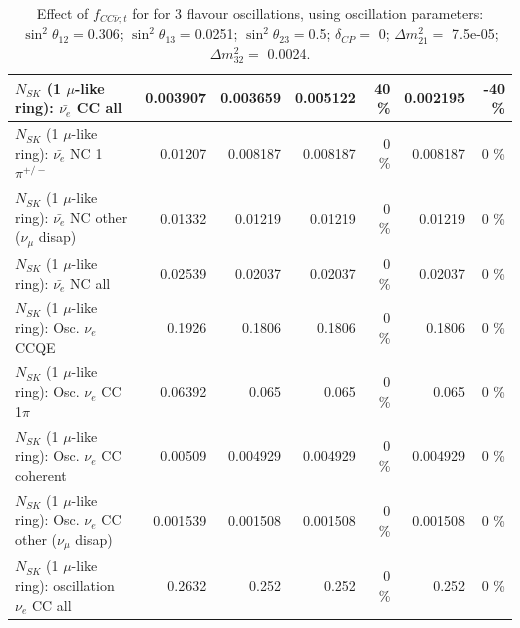 \begin{table}
\begin{tabular}{| l | r | r | r  r | r  r |}
                            $N_{SK}$ (1 $\mu$-like ring): $\bar{\nu_{e}}$ CC all &        0.003907 &        0.003659 &        0.005122 &       40 \%  &        0.002195 &      -40 \%  \\ 
\hline
                     $N_{SK}$ (1 $\mu$-like ring): $\bar{\nu_e}$ NC 1$\pi^{+/-}$ &         0.01207 &        0.008187 &        0.008187 &        0 \%  &        0.008187 &        0 \%  \\ 
          $N_{SK}$ (1 $\mu$-like ring): $\bar{\nu_e}$ NC other ($\nu_\mu$ disap) &         0.01332 &         0.01219 &         0.01219 &        0 \%  &         0.01219 &        0 \%  \\ 
                            $N_{SK}$ (1 $\mu$-like ring): $\bar{\nu_{e}}$ NC all &         0.02539 &         0.02037 &         0.02037 &        0 \%  &         0.02037 &        0 \%  \\ 
\hline
\hline
\hline
                                 $N_{SK}$ (1 $\mu$-like ring): Osc. $\nu_e$ CCQE &          0.1926 &          0.1806 &          0.1806 &        0 \%  &          0.1806 &        0 \%  \\ 
                            $N_{SK}$ (1 $\mu$-like ring): Osc. $\nu_e$ CC 1$\pi$ &         0.06392 &           0.065 &           0.065 &        0 \%  &           0.065 &        0 \%  \\ 
                          $N_{SK}$ (1 $\mu$-like ring): Osc. $\nu_e$ CC coherent &         0.00509 &        0.004929 &        0.004929 &        0 \%  &        0.004929 &        0 \%  \\ 
           $N_{SK}$ (1 $\mu$-like ring): Osc. $\nu_e$ CC other ($\nu_\mu$ disap) &        0.001539 &        0.001508 &        0.001508 &        0 \%  &        0.001508 &        0 \%  \\ 
                        $N_{SK}$ (1 $\mu$-like ring): oscillation $\nu_e$ CC all &          0.2632 &           0.252 &           0.252 &        0 \%  &           0.252 &        0 \%  \\ 
\hline
\hline
\end{tabular}
\caption{ Effect of $f_{CC\bar{\nu}; t}$ for for 3 flavour oscillations, using oscillation parameters:  $\sin^2\theta_{12} = $0.306; $\sin^2\theta_{13} = $0.0251; $\sin^2\theta_{23} = $0.5; $\delta_{CP} = $        0; $\Delta m^2_{21} = $    7.5e-05; $\Delta m^2_{32} = $    0.0024. }
\label{tab:num_xsec_norm_antinutonu_1RmuT_3f_osc_t13:0.0251}
\end{table}
\clearpage
